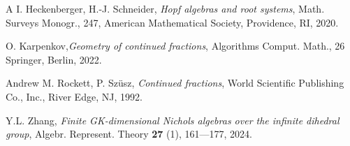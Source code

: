 \documentclass{amsproc}
\theoremstyle{definition}
\theoremstyle{remark}
\numberwithin{equation}{section}
\begin{document}
\begin{thebibliography}{A}
  I. Heckenberger, H.-J. Schneider, \textit {Hopf algebras and root systems}, 
Math. Surveys Monogr., 247, American Mathematical Society, Providence, RI, 2020.




 O. Karpenkov,\textit {Geometry of continued fractions}, Algorithms Comput. Math., 26 Springer, Berlin, 2022.





 Andrew M. Rockett, P. Szüsz, \textit {Continued fractions},
World Scientific Publishing Co., Inc., River Edge, NJ, 1992.





 Y.L. Zhang, \textit {Finite GK-dimensional Nichols algebras over the infinite dihedral group},
Algebr. Represent. Theory {\bf 27} (1), 161---177, 2024.
\end{thebibliography}
\end{document}
